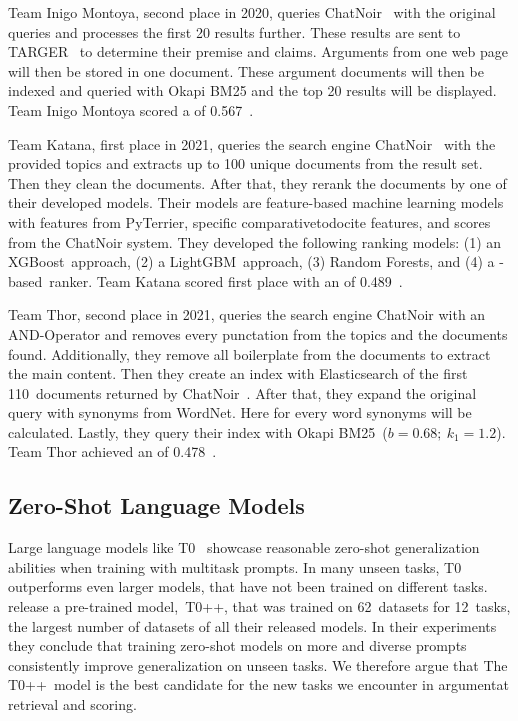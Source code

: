 Team Inigo Montoya, second place in 2020, queries ChatNoir~\cite{BevendorffSHP2018} with the original queries and processes the first 20 results further.
These results are sent to TARGER~\cite{ChernodubOHBHBP2019} to determine their premise and claims.
Arguments from one web page will then be stored in one document.
These argument documents will then be indexed and queried with Okapi BM25 and the top 20 results will be displayed.
Team Inigo Montoya scored a  of 0.567~\cite{Huck2020}.

Team Katana, first place in 2021, queries the search engine ChatNoir~\cite{BevendorffSHP2018} with the provided topics and extracts up to 100 unique documents from the result set.
Then they clean the documents. 
After that, they rerank the documents by one of their developed models.
Their models are feature-based machine learning models with features from PyTerrier, specific comparativetodocite features, and scores from the ChatNoir system. They developed the following ranking models:
(1) an XGBoost~\todocite approach, (2) a LightGBM~\todocite approach, (3) Random Forests, and (4) a \Bert-based~\todocite ranker.
Team Katana scored first place with an  of 0.489~\cite{ChekalinaP2021}.

Team Thor, second place in 2021, queries the search engine ChatNoir with an AND-Operator and removes every punctation from the topics and the documents found.
Additionally, they remove all boilerplate from the documents to extract the main content.
Then they create an index with Elasticsearch of the first 110~documents returned by ChatNoir~\todocite.
After that, they expand the original query with synonyms from WordNet.
Here for every word synonyms will be calculated.
Lastly, they query their index with Okapi BM25~(\( b = 0.68;~k_1 = 1.2 \)).
Team Thor achieved an  of 0.478~\cite{ShirshakovaW2021}.

\subsection{Zero-Shot Language Models}

Large language models like T0~\cite{SanhWRBSACSLRDBXTSSKCNDCJWMSYPBWNRSSFFTBGBWR2021} showcase reasonable zero-shot generalization abilities when training with multitask prompts.
In many unseen tasks, T0 outperforms even larger models, that have not been trained on different tasks.
\citet{SanhWRBSACSLRDBXTSSKCNDCJWMSYPBWNRSSFFTBGBWR2021} release a pre-trained model,~T0++, that was trained on 62~datasets for 12~tasks, the largest number of datasets of all their released models.
In their experiments they conclude that training zero-shot models on more and diverse prompts consistently improve generalization on unseen tasks.
We therefore argue that The T0++~model is the best candidate for the new tasks we encounter in argumentat retrieval and scoring.

